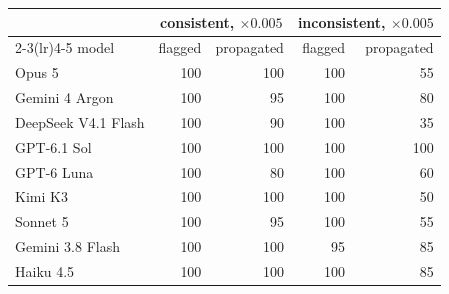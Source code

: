 \begin{tabular}{lrrrr}
\toprule
& \multicolumn{2}{c}{consistent, $\times 0.005$} & \multicolumn{2}{c}{inconsistent, $\times 0.005$} \\
\cmidrule(lr){2-3}\cmidrule(lr){4-5}
model & flagged & propagated & flagged & propagated \\
\midrule
Opus 5 & 100 & 100 & 100 & 55 \\
Gemini 4 Argon & 100 & 95 & 100 & 80 \\
DeepSeek V4.1 Flash & 100 & 90 & 100 & 35 \\
GPT-6.1 Sol & 100 & 100 & 100 & 100 \\
GPT-6 Luna & 100 & 80 & 100 & 60 \\
Kimi K3 & 100 & 100 & 100 & 50 \\
Sonnet 5 & 100 & 95 & 100 & 55 \\
Gemini 3.8 Flash & 100 & 100 & 95 & 85 \\
Haiku 4.5 & 100 & 100 & 100 & 85 \\
\bottomrule
\end{tabular}
